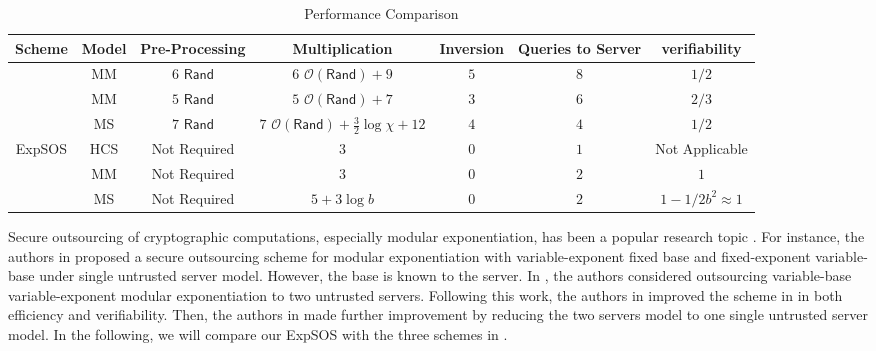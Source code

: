 \documentclass[english,draftcls,onecolumn,11pt]{IEEEtran}
\providecommand{\tabularnewline}{\\}
\theoremstyle{definition}
\theoremstyle{plain}
\theoremstyle{plain}
\theoremstyle{definition}
\begin{document}
\begin{table*}
\caption{Performance Comparison\label{tab:Performance-Comparison-1}}


\begin{spacing}{1.1}
\centering{}\begin{tabular}{|c|c|c|c|c|c|c|}
\hline 
\textbf{Scheme} & \textbf{Model} & \textbf{Pre-Processing} & \textbf{Multiplication} & \textbf{Inversion} & \textbf{Queries to Server} & \textbf{verifiability}\tabularnewline
\hline 
\hline 
\cite{hohenberger2005securely} & MM & $6$ $\mathsf{Rand}$ & $6$ $\mathcal{O}(\mathsf{Rand})+9$  & $5$ & $8$ & $1/2$\tabularnewline
\hline 
\cite{chen2012new} & MM & $5$ $\mathsf{Rand}$  & $5$ $\mathcal{O}(\mathsf{Rand})+7$ & $3$ & $6$ & $2/3$\tabularnewline
\hline 
\cite{wang2014securely} & MS & $7$ $\mathsf{Rand}$  & $7$ $\mathcal{O}(\mathsf{Rand})+\frac{3}{2}\log\chi+12$ & $4$ & $4$ & $1/2$\tabularnewline
\hline 
\multirow{3}{*}{ExpSOS} & HCS & Not Required & $3$ & $0$ & $1$ & Not Applicable\tabularnewline
\cline{2-7} 
 & MM & Not Required & $3$ & $0$ & $2$ & $1$\tabularnewline
\cline{2-7} 
 & MS & Not Required & $5+3\log b$ & $0$ & $2$ & $1-1/2b^{2}\approx1$\tabularnewline
\hline 
\end{tabular}\end{spacing}
\end{table*}


Secure outsourcing of cryptographic computations, especially modular
exponentiation, has been a popular research topic \cite{hohenberger2005securely,chen2012new,wang2014securely,matsumoto1990speeding,de1997schnorr,boyko1998speeding,nguyen2001distribution,van2006speeding}.
For instance, the authors in \cite{van2006speeding} proposed a secure
outsourcing scheme for modular exponentiation with variable-exponent
fixed base and fixed-exponent variable-base under single untrusted
server model. However, the base is known to the server. In \cite{hohenberger2005securely},
the authors considered outsourcing variable-base variable-exponent
modular exponentiation to two untrusted servers. Following this work,
the authors in \cite{chen2012new} improved the scheme in \cite{hohenberger2005securely}
in both efficiency and verifiability. Then, the authors in \cite{wang2014securely}
made further improvement by reducing the two servers model to one
single untrusted server model. In the following, we will compare our
ExpSOS with the three schemes in \cite{hohenberger2005securely,chen2012new,wang2014securely}.
\end{document}
